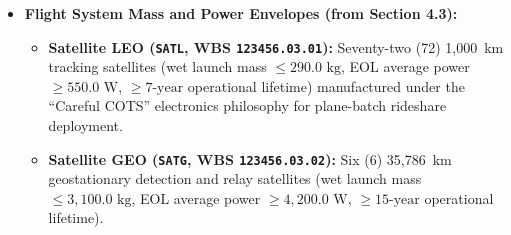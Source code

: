 \documentclass[11pt,a4paper]{article}
\providecommand{\abbr}[1]{#1}
\begin{document}
\begin{itemize}
    \item \textbf{Flight System Mass and Power Envelopes (from Section 4.3):}
    \begin{itemize}
        \item \textbf{Satellite \abbr{LEO} (\texttt{SATL}, \abbr{WBS} \texttt{123456.03.01}):} Seventy-two (72) 1,000~km tracking satellites (wet launch mass $\le 290.0\text{ kg}$, \abbr{EOL} average power $\ge 550.0\text{ W}$, $\ge 7\text{-year}$ operational lifetime) manufactured under the ``Careful \abbr{COTS}'' electronics philosophy for plane-batch rideshare deployment.
        \item \textbf{Satellite \abbr{GEO} (\texttt{SATG}, \abbr{WBS} \texttt{123456.03.02}):} Six (6) 35,786~km geostationary detection and relay satellites (wet launch mass $\le 3{,}100.0\text{ kg}$, \abbr{EOL} average power $\ge 4{,}200.0\text{ W}$, $\ge 15\text{-year}$ operational lifetime).
    \end{itemize}
\end{itemize}
\end{document}
